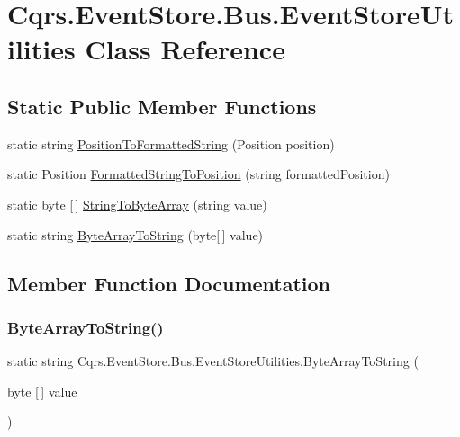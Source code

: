 \hypertarget{classCqrs_1_1EventStore_1_1Bus_1_1EventStoreUtilities}{}\section{Cqrs.\+Event\+Store.\+Bus.\+Event\+Store\+Utilities Class Reference}
\label{classCqrs_1_1EventStore_1_1Bus_1_1EventStoreUtilities}
\subsection*{Static Public Member Functions}
\begin{DoxyCompactItemize}
\item 
static string \hyperlink{classCqrs_1_1EventStore_1_1Bus_1_1EventStoreUtilities_aba4f88ffbd314a485ced0c0528b5cd9b}{Position\+To\+Formatted\+String} (Position position)
\item 
static Position \hyperlink{classCqrs_1_1EventStore_1_1Bus_1_1EventStoreUtilities_a69b19078c9835cb4f7c7b903fa5ca1eb}{Formatted\+String\+To\+Position} (string formatted\+Position)
\item 
static byte \mbox{[}$\,$\mbox{]} \hyperlink{classCqrs_1_1EventStore_1_1Bus_1_1EventStoreUtilities_a1bf8620c91556b5e0e804a2467711989}{String\+To\+Byte\+Array} (string value)
\item 
static string \hyperlink{classCqrs_1_1EventStore_1_1Bus_1_1EventStoreUtilities_af4b4ca47a50ce0c037625c0bc8ae6d49}{Byte\+Array\+To\+String} (byte\mbox{[}$\,$\mbox{]} value)
\end{DoxyCompactItemize}


\subsection{Member Function Documentation}
\mbox{\label{classCqrs_1_1EventStore_1_1Bus_1_1EventStoreUtilities_af4b4ca47a50ce0c037625c0bc8ae6d49}} 
\subsubsection{\texorpdfstring{Byte\+Array\+To\+String()}{ByteArrayToString()}}
{\footnotesize\ttfamily static string Cqrs.\+Event\+Store.\+Bus.\+Event\+Store\+Utilities.\+Byte\+Array\+To\+String (\begin{DoxyParamCaption}\item[{byte \mbox{[}$\,$\mbox{]}}]{value }\end{DoxyParamCaption})\hspace{0.3cm}{\ttfamily [static]}}

